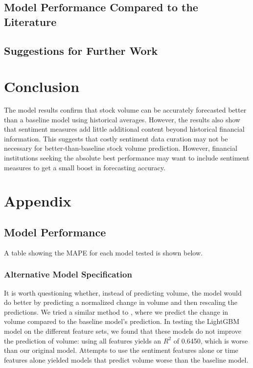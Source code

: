\documentclass[12pt]{article}
\begin{document}
\subsection{Model Performance Compared to the Literature}
\subsection{Suggestions for Further Work}

\section{Conclusion}
The model results confirm that stock volume can be accurately forecasted better than a baseline model using historical averages. However, the results also show that sentiment measures add little additional content beyond historical financial information. This suggests that costly sentiment data curation may not be necessary for better-than-baseline stock volume prediction. However, financial institutions seeking the absolute best performance may want to include sentiment measures to get a small boost in forecasting accuracy.

\newpage
\printbibliography

\section{Appendix}
\subsection{Model Performance}
A table showing the MAPE for each model tested is shown below.


\subsubsection{Alternative Model Specification}
It is worth questioning whether, instead of predicting volume, the model would do better by predicting a normalized change in volume and then rescaling the predictions. We tried a similar method to \textcite{goyenko2024trading}, where we predict the change in volume compared to the baseline model's prediction. In testing the LightGBM model on the different feature sets, we found that these models do not improve the prediction of volume: using all features yields an $R^2$ of 0.6450, which is worse than our original model. Attempts to use the sentiment features alone or time features alone yielded models that predict volume worse than the baseline model.
\end{document}
